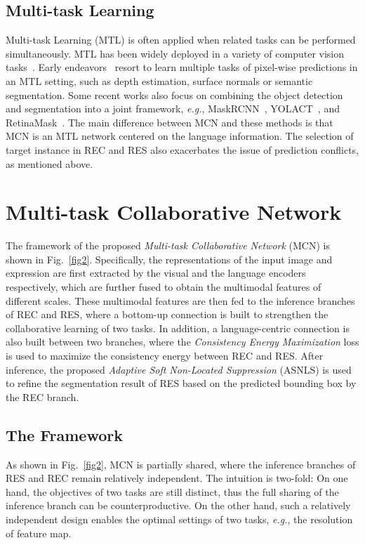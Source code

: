 \documentclass[10pt,twocolumn,letterpaper]{article}
\begin{document}
\subsection{Multi-task Learning}
Multi-task Learning (MTL) is often applied when related tasks can be performed simultaneously. 
MTL has been widely deployed in a variety of computer vision tasks~\cite{eigen2015predicting,chen2018driving,nekrasov2019real,dvornik2017blitznet,he2017mask,ubernet}. 
Early endeavors~\cite{eigen2015predicting,chen2018driving,nekrasov2019real}  resort to learn multiple  tasks of pixel-wise predictions in an MTL setting, such as depth estimation, surface normals or semantic segmentation. 
Some recent works also focus on combining the object detection and segmentation into a joint framework, \emph{e.g.}, MaskRCNN~\cite{he2017mask}, YOLACT~\cite{yolact}, and RetinaMask~\cite{fu2019retinamask}.
The main difference between MCN and these methods is that MCN is an MTL network centered on the language information. 
The selection of target instance in REC and RES also exacerbates the issue of prediction conflicts, as mentioned above.



\section{Multi-task Collaborative Network}
The framework of the proposed \emph{Multi-task Collaborative Network} (MCN) is shown in Fig.~\ref{fig2}. Specifically, the representations of the input image and expression are first extracted by the visual and the language encoders respectively, which are further fused to obtain the multimodal features of different scales. 
These multimodal features are then fed to the inference branches of REC and RES, where a bottom-up connection is built to strengthen the collaborative learning of two tasks. 
In addition, a language-centric connection is also built between two branches, where the \emph{Consistency Energy Maximization} loss is used to maximize the consistency energy between REC and RES.  
After inference, the proposed  
\emph{Adaptive Soft Non-Located Suppression} (ASNLS) is used to refine the segmentation result of RES based on the predicted bounding box by the REC branch. 


\subsection{The Framework}\label{framework}
As shown in Fig.~\ref{fig2}, MCN is partially shared, where the inference branches of RES and REC remain relatively independent.
The intuition is two-fold: 
On one hand, the objectives of two tasks are still distinct, thus the full sharing of the inference branch can be counterproductive. On the other hand, such a relatively independent design  enables the optimal settings of two tasks, \emph{e.g.}, the resolution of feature map.
\end{document}
